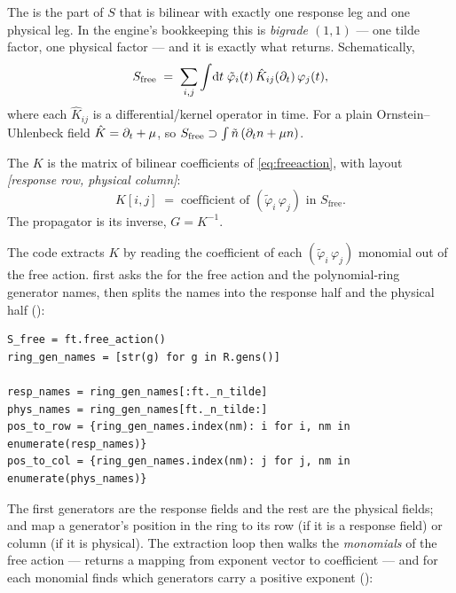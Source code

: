 The  is the part of $S$ that is bilinear with exactly one
response leg and one physical leg. In the engine's bookkeeping this is
\emph{bigrade $(1,1)$} --- one tilde factor, one physical factor --- and it is
exactly what  returns. Schematically,
\begin{equation}
  S_{\mathrm{free}} \;=\; \sum_{i,j}\int\!\mathrm{d} t\;
  \tilde\varphi_i(t)\,\hat K_{ij}(\partial_t)\,\varphi_j(t),
  \label{eq:freeaction}
\end{equation}
where each $\hat K_{ij}$ is a differential/kernel operator in time. For a plain
Ornstein--Uhlenbeck field $\hat K = \partial_t + \mu$, so $S_{\mathrm{free}} \supset
\int \tilde n\,(\partial_t n + \mu n)$.

\begin{defn}
The  $K$ is the matrix of bilinear coefficients of
\eqref{eq:freeaction}, with layout \emph{[response row, physical column]}:
\[
  K[i, j] \;=\; \text{coefficient of }(\tilde\varphi_i\,\varphi_j)
  \text{ in } S_{\mathrm{free}}.
\]
The propagator is its inverse, $G = K^{-1}$.
\end{defn}

The code extracts $K$ by reading the coefficient of each $(\tilde\varphi_i\,
\varphi_j)$ monomial out of the free action.  first asks
the  for the free action and the polynomial-ring generator
names, then splits the names into the response half and the physical half
():

\begin{lstlisting}
S_free = ft.free_action()
ring_gen_names = [str(g) for g in R.gens()]

resp_names = ring_gen_names[:ft._n_tilde]
phys_names = ring_gen_names[ft._n_tilde:]
pos_to_row = {ring_gen_names.index(nm): i for i, nm in enumerate(resp_names)}
pos_to_col = {ring_gen_names.index(nm): j for j, nm in enumerate(phys_names)}
\end{lstlisting}

The first  generators are the response fields and the rest are
the physical fields;  and  map a generator's
position in the ring to its row (if it is a response field) or column (if it is
physical). The extraction loop then walks the \emph{monomials} of the free action
---  returns a mapping from exponent vector to coefficient ---
and for each monomial finds which generators carry a positive exponent
():

